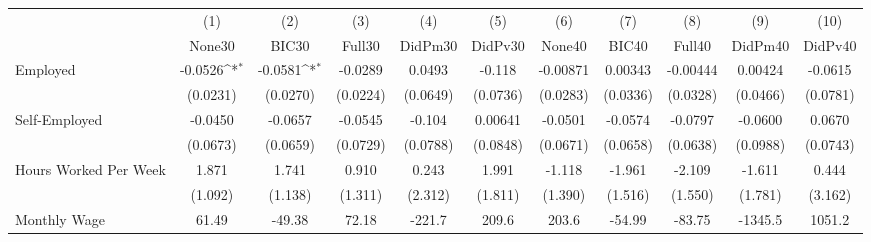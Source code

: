 {
\def\sym#1{\ifmmode^{#1}\else\(^{#1}\)\fi}
\begin{tabular}{l*{10}{c}}
\toprule
            &\multicolumn{1}{c}{(1)}&\multicolumn{1}{c}{(2)}&\multicolumn{1}{c}{(3)}&\multicolumn{1}{c}{(4)}&\multicolumn{1}{c}{(5)}&\multicolumn{1}{c}{(6)}&\multicolumn{1}{c}{(7)}&\multicolumn{1}{c}{(8)}&\multicolumn{1}{c}{(9)}&\multicolumn{1}{c}{(10)}\\
            &\multicolumn{1}{c}{None30}&\multicolumn{1}{c}{BIC30}&\multicolumn{1}{c}{Full30}&\multicolumn{1}{c}{DidPm30}&\multicolumn{1}{c}{DidPv30}&\multicolumn{1}{c}{None40}&\multicolumn{1}{c}{BIC40}&\multicolumn{1}{c}{Full40}&\multicolumn{1}{c}{DidPm40}&\multicolumn{1}{c}{DidPv40}\\
\midrule
Employed    &     -0.0526\sym{*}  &     -0.0581\sym{*}  &     -0.0289         &      0.0493         &      -0.118         &    -0.00871         &     0.00343         &    -0.00444         &     0.00424         &     -0.0615         \\
            &    (0.0231)         &    (0.0270)         &    (0.0224)         &    (0.0649)         &    (0.0736)         &    (0.0283)         &    (0.0336)         &    (0.0328)         &    (0.0466)         &    (0.0781)         \\
\addlinespace
Self-Employed&     -0.0450         &     -0.0657         &     -0.0545         &      -0.104         &     0.00641         &     -0.0501         &     -0.0574         &     -0.0797         &     -0.0600         &      0.0670         \\
            &    (0.0673)         &    (0.0659)         &    (0.0729)         &    (0.0788)         &    (0.0848)         &    (0.0671)         &    (0.0658)         &    (0.0638)         &    (0.0988)         &    (0.0743)         \\
\addlinespace
Hours Worked Per Week&       1.871         &       1.741         &       0.910         &       0.243         &       1.991         &      -1.118         &      -1.961         &      -2.109         &      -1.611         &       0.444         \\
            &     (1.092)         &     (1.138)         &     (1.311)         &     (2.312)         &     (1.811)         &     (1.390)         &     (1.516)         &     (1.550)         &     (1.781)         &     (3.162)         \\
\addlinespace
Monthly Wage&       61.49         &      -49.38         &       72.18         &      -221.7         &       209.6         &       203.6         &      -54.99         &      -83.75         &     -1345.5         &      1051.2         \\

\end{tabular}}
